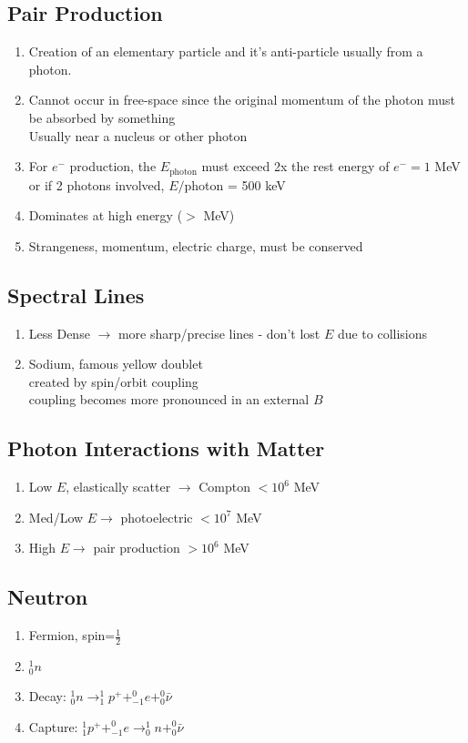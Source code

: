 \documentclass[10pt,a4paper]{article}
\begin{document}
\subsection{Pair Production}
\begin{enumerate}
    \item Creation of an elementary particle and it's anti-particle usually from a photon.
    \item Cannot occur in free-space since the original momentum of the photon must be absorbed by something\\
    Usually near a nucleus or other photon
    \item For $e^-$ production, the $E_{\textrm{photon}}$ must exceed 2x the rest energy of $e^- = 1$ MeV or if 2 photons involved, $E/$photon = 500 keV
    \item Dominates at high energy ($>$ MeV)
    \item Strangeness, momentum, electric charge, must be conserved
\end{enumerate}

\subsection{Spectral Lines}
\begin{enumerate}
    \item Less Dense $\rightarrow $ more sharp/precise lines - don't lost $E$ due to collisions
    \item Sodium, famous yellow doublet\\
        created by spin/orbit coupling\\
        coupling becomes more pronounced in an external $B$
\end{enumerate}

\subsection{Photon Interactions with Matter}
\begin{enumerate}
    \item Low $E$, elastically scatter $\rightarrow$ Compton   $<10^6$ MeV
    \item Med/Low $E \rightarrow$ photoelectric         $<10^7$ MeV
    \item High $E \rightarrow$ pair production      $>10^6$ MeV
\end{enumerate}

\subsection{Neutron}
\begin{enumerate}
    \item Fermion, spin=$\frac{1}{2}$
    \item $^1_0n$
    \item Decay: $^1_0n \rightarrow ^1_1p^+ + ^0_{-1}e + ^0_0\bar{\nu}$
    \item Capture: $^1_1p^+ + ^0_{-1}e \rightarrow ^1_0n + ^0_0 \bar{\nu}$
\end{enumerate}
\end{document}
